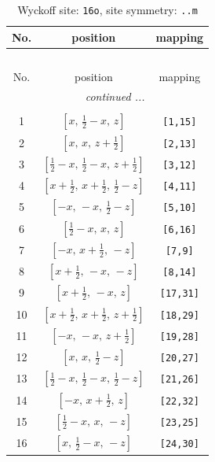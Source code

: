 \documentclass[fleqn,8pt]{jsarticle}
\begin{document}
\renewcommand{\arraystretch}{1.2}
\begin{longtable}{ccc}
\caption{Wyckoff site: {\tt 16o}, site symmetry: {\tt ..m}}
 \\
 \hline \hline
No. & position & mapping \\ \hline \endfirsthead

\multicolumn{2}{l}{\tablename\ \thetable{}} \\
 \hline \hline
No. & position & mapping \\ \hline \endhead

 \hline \hline
\multicolumn{2}{r}{\footnotesize\it continued ...} \\ \endfoot

 \hline \hline
\multicolumn{2}{r}{} \\ \endlastfoot

1 & $\left[ x,\, \frac{1}{2} - x,\, z \right]$ & {\tt [1,15]} \\ \hline
2 & $\left[ x,\, x,\, z + \frac{1}{2} \right]$ & {\tt [2,13]} \\ \hline
3 & $\left[ \frac{1}{2} - x,\, \frac{1}{2} - x,\, z + \frac{1}{2} \right]$ & {\tt [3,12]} \\ \hline
4 & $\left[ x + \frac{1}{2},\, x + \frac{1}{2},\, \frac{1}{2} - z \right]$ & {\tt [4,11]} \\ \hline
5 & $\left[ - x,\, - x,\, \frac{1}{2} - z \right]$ & {\tt [5,10]} \\ \hline
6 & $\left[ \frac{1}{2} - x,\, x,\, z \right]$ & {\tt [6,16]} \\ \hline
7 & $\left[ - x,\, x + \frac{1}{2},\, - z \right]$ & {\tt [7,9]} \\ \hline
8 & $\left[ x + \frac{1}{2},\, - x,\, - z \right]$ & {\tt [8,14]} \\ \hline
9 & $\left[ x + \frac{1}{2},\, - x,\, z \right]$ & {\tt [17,31]} \\ \hline
10 & $\left[ x + \frac{1}{2},\, x + \frac{1}{2},\, z + \frac{1}{2} \right]$ & {\tt [18,29]} \\ \hline
11 & $\left[ - x,\, - x,\, z + \frac{1}{2} \right]$ & {\tt [19,28]} \\ \hline
12 & $\left[ x,\, x,\, \frac{1}{2} - z \right]$ & {\tt [20,27]} \\ \hline
13 & $\left[ \frac{1}{2} - x,\, \frac{1}{2} - x,\, \frac{1}{2} - z \right]$ & {\tt [21,26]} \\ \hline
14 & $\left[ - x,\, x + \frac{1}{2},\, z \right]$ & {\tt [22,32]} \\ \hline
15 & $\left[ \frac{1}{2} - x,\, x,\, - z \right]$ & {\tt [23,25]} \\ \hline
16 & $\left[ x,\, \frac{1}{2} - x,\, - z \right]$ & {\tt [24,30]} \\
\end{longtable}
\end{document}
